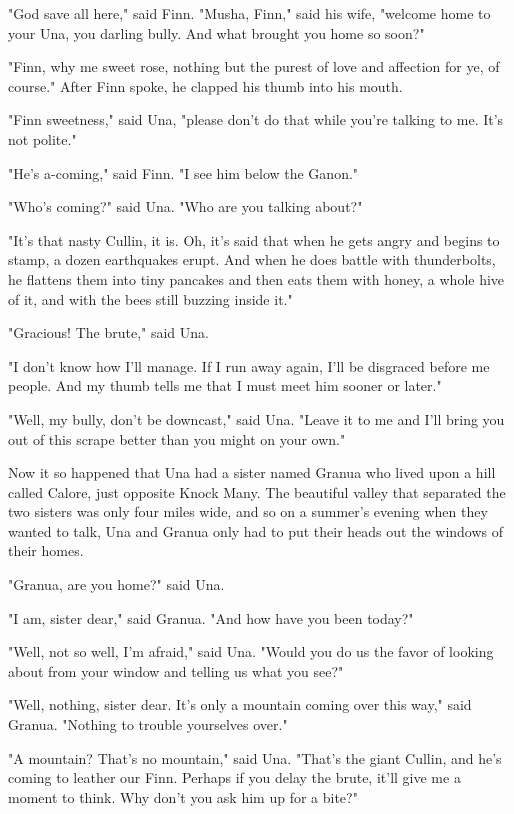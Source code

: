 "God save all here," said Finn. "Musha, Finn," said his wife, "welcome home to your Una, you darling bully. And what brought you home so soon?"

"Finn, why me sweet rose, nothing but the purest of love and affection for ye, of course." After Finn spoke, he clapped his thumb into his mouth.

"Finn sweetness," said Una, "please don't do that while you're talking to me. It's not polite."

"He's a-coming," said Finn. "I see him below the Ganon."

"Who's coming?" said Una. "Who are you talking about?"

"It's that nasty Cullin, it is. Oh, it's said that when he gets angry and begins to stamp, a dozen earthquakes erupt. And when he does battle with thunderbolts, he flattens them into tiny pancakes and then eats them with honey, a whole hive of it, and with the bees still buzzing inside it."

"Gracious! The brute," said Una.

"I don't know how I'll manage. If I run away again, I'll be disgraced before me people. And my thumb tells me that I must meet him sooner or later."

"Well, my bully, don't be downcast," said Una. "Leave it to me and I'll bring you out of this scrape better than you might on your own."

Now it so happened that Una had a sister named Granua who lived upon a hill called Calore, just opposite Knock Many. The beautiful valley that separated the two sisters was only four miles wide, and so on a summer's evening when they wanted to talk, Una and Granua only had to put their heads out the windows of their homes.

"Granua, are you home?" said Una.

"I am, sister dear," said Granua. "And how have you been today?"

"Well, not so well, I'm afraid," said Una. "Would you do us the favor of looking about from your window and telling us what you see?"

"Well, nothing, sister dear. It's only a mountain coming over this way," said Granua. "Nothing to trouble yourselves over."

"A mountain? That's no mountain," said Una. "That's the giant Cullin, and he's coming to leather our Finn. Perhaps if you delay the brute, it'll give me a moment to think. Why don't you ask him up for a bite?"

